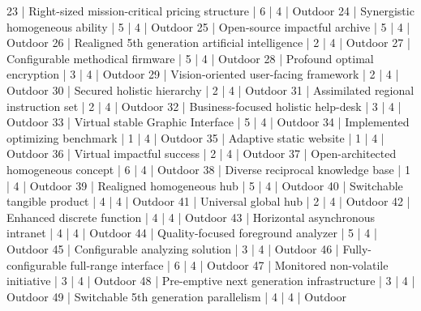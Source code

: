 \begin{enumerate}
\begin{pseudo*}
      23 | Right-sized mission-critical pricing structure   |        6 |      4 | Outdoor       
      24 | Synergistic homogeneous ability                  |        5 |      4 | Outdoor       
      25 | Open-source impactful archive                    |        5 |      4 | Outdoor       
      26 | Realigned 5th generation artificial intelligence |        2 |      4 | Outdoor       
      27 | Configurable methodical firmware                 |        5 |      4 | Outdoor       
      28 | Profound optimal encryption                      |        3 |      4 | Outdoor       
      29 | Vision-oriented user-facing framework            |        2 |      4 | Outdoor       
      30 | Secured holistic hierarchy                       |        2 |      4 | Outdoor       
      31 | Assimilated regional instruction set             |        2 |      4 | Outdoor       
      32 | Business-focused holistic help-desk              |        3 |      4 | Outdoor       
      33 | Virtual stable Graphic Interface                 |        5 |      4 | Outdoor       
      34 | Implemented optimizing benchmark                 |        1 |      4 | Outdoor       
      35 | Adaptive static website                          |        1 |      4 | Outdoor       
      36 | Virtual impactful success                        |        2 |      4 | Outdoor       
      37 | Open-architected homogeneous concept             |        6 |      4 | Outdoor       
      38 | Diverse reciprocal knowledge base                |        1 |      4 | Outdoor       
      39 | Realigned homogeneous hub                        |        5 |      4 | Outdoor       
      40 | Switchable tangible product                      |        4 |      4 | Outdoor       
      41 | Universal global hub                             |        2 |      4 | Outdoor       
      42 | Enhanced discrete function                       |        4 |      4 | Outdoor       
      43 | Horizontal asynchronous intranet                 |        4 |      4 | Outdoor       
      44 | Quality-focused foreground analyzer              |        5 |      4 | Outdoor       
      45 | Configurable analyzing solution                  |        3 |      4 | Outdoor       
      46 | Fully-configurable full-range interface          |        6 |      4 | Outdoor       
      47 | Monitored non-volatile initiative                |        3 |      4 | Outdoor       
      48 | Pre-emptive next generation infrastructure       |        3 |      4 | Outdoor       
      49 | Switchable 5th generation parallelism            |        4 |      4 | Outdoor       

\end{pseudo*}
\end{enumerate}
